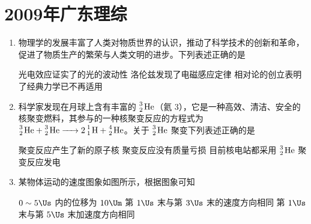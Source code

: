 \documentclass[\gkver]{gaokaozhenti}
\begin{document}
\chapter{2009年广东理综}

\begin{enumerate}
\item
物理学的发展丰富了人类对物质世界的认识，推动了科学技术的创新和革命，促进了物质生产的繁荣与人类文明的进步。下列表述正确的是

{光电效应证实了的光的波动性}
{洛伦兹发现了电磁感应定律}
{相对论的创立表明了经典力学已不再适用}


\item
科学家发现在月球上含有丰富的 $\ce{^3_2 He}$（氦 3），它是一种高效、清洁、安全的核聚变燃料，其参与的一种核聚变反应的方程式为 $\ce{^3_2 He + ^3_2 He -> 2 ^1_1 H + ^4_2 He}$。关于 $\ce{^3_2 He}$ 聚变下列表述正确的是

{聚变反应产生了新的原子核}
{聚变反应没有质量亏损}
{目前核电站都采用 $\ce{^3_2 He}$ 聚变反应发电}


\item
某物体运动的速度图象如图所示，根据图象可知


{$0\sim5\Us$ 内的位移为 $10\Um$}
{第 $1\Us$ 末与第 $3\Us$ 末的速度方向相同}
{第 $1\Us$ 末与第 $5\Us$ 末加速度方向相同}


\end{enumerate}
\end{document}

